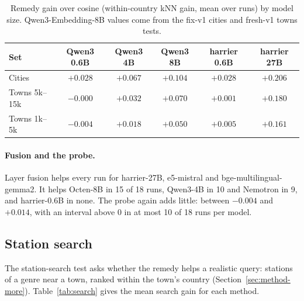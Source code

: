 \begin{table}[t]
\centering
\footnotesize
\caption{Remedy gain over cosine (within-country kNN gain, mean over runs) by model size. Qwen3-Embedding-8B values come from the fix-v1 cities and fresh-v1 towns tests.}
\label{tab:size}
\begin{tabular}{@{}lccccc@{}}
\toprule
Set & Qwen3 0.6B & Qwen3 4B & Qwen3 8B & harrier 0.6B & harrier 27B \\
\midrule
Cities & $+0.028$ & $+0.067$ & $+0.104$ & $+0.028$ & $+0.206$ \\
Towns 5k--15k & $-0.000$ & $+0.032$ & $+0.070$ & $+0.001$ & $+0.180$ \\
Towns 1k--5k & $-0.004$ & $+0.018$ & $+0.050$ & $+0.005$ & $+0.161$ \\
\bottomrule
\end{tabular}
\end{table}

\paragraph{Fusion and the probe.}
Layer fusion helps every run for harrier-27B, e5-mistral and bge-multilingual-gemma2. It helps Octen-8B in 15 of 18 runs, Qwen3-4B in 10 and Nemotron in 9, and harrier-0.6B in none. The probe again adds little: between $-0.004$ and $+0.014$, with an interval above 0 in at most 10 of 18 runs per model.

\subsection{Station search}
\label{sec:res-search}

The station-search test asks whether the remedy helps a realistic query: stations of a genre near a town, ranked within the town's country (Section~\ref{sec:method-more}). Table~\ref{tab:search} gives the mean search gain for each method.

